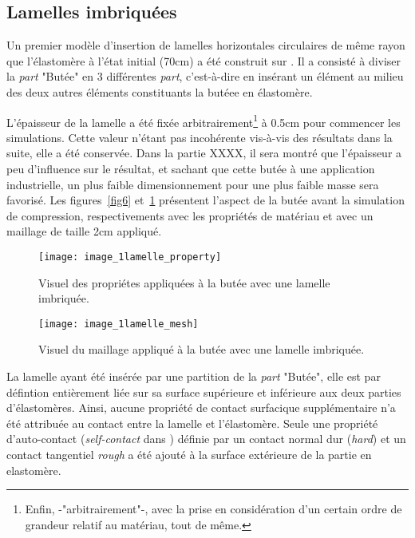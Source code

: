 ﻿\documentclass{article}
\newcommand{\abaqus}{\bsc{Abaqus}\xspace}
\begin{document}
\subsection{Lamelles imbriquées}

Un premier modèle d'insertion de lamelles horizontales circulaires de même rayon que l'élastomère à l'état initial (70cm) a été construit sur \abaqus. Il a consisté à diviser la \textit{part} "Butée" en 3 différentes \textit{part}, c'est-à-dire en insérant un élément au milieu des deux autres éléments constituants la butéee en élastomère.

L'épaisseur de la lamelle a été fixée arbitrairement\footnote{Enfin, -"arbitrairement"-, avec la prise en considération d'un certain ordre de grandeur relatif au matériau, tout de même.} à 0.5cm pour commencer les simulations. Cette valeur n'étant pas incohérente vis-à-vis des résultats dans la suite, elle a été conservée. Dans la partie XXXX, il sera montré que l'épaisseur a peu d'influence sur le résultat, et sachant que cette butée à une application industrielle, un plus faible dimensionnement pour une plus faible masse sera favorisé. 
Les figures~\ref{fig6} et~\ref{fig7} présentent l'aspect de la butée avant la simulation de compression, respectivements avec les propriétés de matériau et avec un maillage de taille 2cm appliqué.

\begin{figure}[htbp]
	\begin{minipage}[c]{.45\linewidth}
	\begin{center}
	\texttt{[image: image\_1lamelle\_property]}
	\caption{Visuel des propriétes appliquées à la butée avec une lamelle imbriquée.}
	\label{fig6}
	\end{center}
	\end{minipage}
	\hfill
	\begin{minipage}[c]{.45\linewidth}
	\begin{center}
	\texttt{[image: image\_1lamelle\_mesh]}
	\caption{Visuel du maillage appliqué à la butée avec une lamelle imbriquée.}
	\label{fig7}
	\end{center}
	\end{minipage}
\end{figure}

La lamelle ayant été insérée par une partition de la \textit{part} "Butée", elle est par défintion entièrement liée sur sa surface supérieure et inférieure aux deux parties d'élastomères. Ainsi, aucune propriété de contact surfacique supplémentaire n'a été attribuée au contact entre la lamelle et l'élastomère. Seule une propriété d'auto-contact (\textit{self-contact} dans \abaqus) définie par un contact normal dur (\textit{hard}) et un contact tangentiel \textit{rough} a été ajouté à la surface extérieure de la partie en elastomère. 
\end{document}
